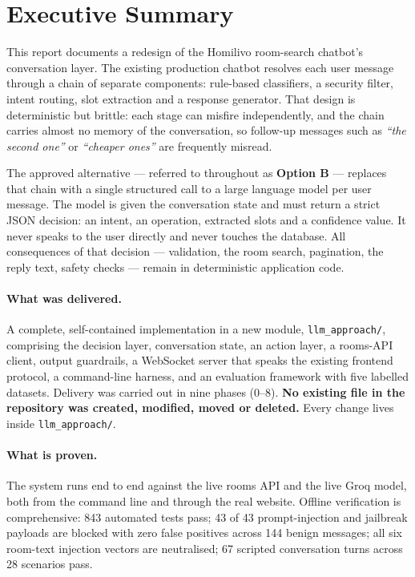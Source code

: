 \documentclass[11pt,a4paper]{article}
\newcommand{\fn}[1]{\texttt{\small #1}}
\begin{document}
\section{Executive Summary}

This report documents a redesign of the Homilivo room-search chatbot's conversation
layer. The existing production chatbot resolves each user message through a chain of
separate components: rule-based classifiers, a security filter, intent routing, slot
extraction and a response generator. That design is deterministic but brittle: each stage
can misfire independently, and the chain carries almost no memory of the conversation, so
follow-up messages such as \emph{``the second one''} or \emph{``cheaper ones''} are
frequently misread.

The approved alternative --- referred to throughout as \textbf{Option B} --- replaces that
chain with a single structured call to a large language model per user message. The model
is given the conversation state and must return a strict JSON decision: an intent, an
operation, extracted slots and a confidence value. It never speaks to the user directly and
never touches the database. All consequences of that decision --- validation, the room
search, pagination, the reply text, safety checks --- remain in deterministic application
code.

\paragraph{What was delivered.} A complete, self-contained implementation in a new module,
\fn{llm\_approach/}, comprising the decision layer, conversation state, an action layer, a
rooms-API client, output guardrails, a WebSocket server that speaks the existing frontend
protocol, a command-line harness, and an evaluation framework with five labelled datasets.
Delivery was carried out in nine phases (0--8). \textbf{No existing file in the repository was
created, modified, moved or deleted.} Every change lives inside \fn{llm\_approach/}.

\paragraph{What is proven.} The system runs end to end against the live rooms API and the
live Groq model, both from the command line and through the real website. Offline
verification is comprehensive: 843 automated tests pass; 43 of 43 prompt-injection and
jailbreak payloads are blocked with zero false positives across 144 benign messages; all six
room-text injection vectors are neutralised; 67 scripted conversation turns across 28
scenarios pass.
\end{document}

